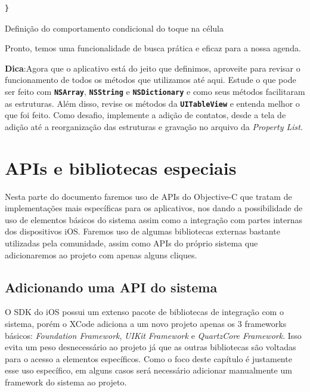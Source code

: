 \documentclass[a4paper,12pt,brazil,doubleside]{book}
\begin{document}
\begin{singlespace}
\begin{listing}[H]
\begin{verbatim}
}
\end{verbatim}
\caption{Definição do comportamento condicional do toque na célula}
\end{listing}


Pronto, temos uma funcionalidade de busca prática e eficaz para a nossa agenda.

\begin{framed}

\textbf{Dica}:Agora que o aplicativo está do jeito que definimos, aproveite para revisar o funcionamento de todos os métodos que utilizamos até aqui. Estude o que pode ser feito com \texttt{\textbf{NSArray}}, \texttt{\textbf{NSString}} e \texttt{\textbf{NSDictionary}} e como seus métodos facilitaram as estruturas. Além disso, revise os métodos da \texttt{\textbf{UITableView}} e entenda melhor o que foi feito. Como desafio, implemente a adição de contatos, desde a tela de adição até a reorganização das estruturas e gravação no arquivo da \emph{Property List}.
\end{framed}

\chapter{APIs e bibliotecas especiais}

Nesta parte do documento faremos uso de APIs do Objective-C que tratam de implementações mais específicas para os aplicativos, nos dando a possibilidade de uso de elementos básicos do sistema assim como a integração com partes internas dos dispositivos iOS. Faremos uso de algumas bibliotecas externas bastante utilizadas pela comunidade, assim como APIs do próprio sistema que adicionaremos ao projeto com apenas alguns cliques.

\section{Adicionando uma API do sistema}

O SDK do iOS possui um extenso pacote de bibliotecas de integração com o sistema, porém o XCode adiciona a um novo projeto apenas os 3 frameworks básicos: \emph{Foundation Framework}, \emph{UIKit Framework} e \emph{QuartzCore Framework}. Isso evita um peso desnecessário ao projeto já que as outras bibliotecas são voltadas para o acesso a elementos específicos. Como o foco deste capítulo é justamente esse uso específico, em alguns casos será necessário adicionar manualmente um framework do sistema ao projeto.


\end{singlespace}
\end{document}
